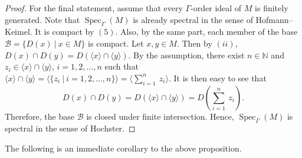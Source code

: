 \documentclass[a4paper,reqno,12pt]{amsart}
\numberwithin{equation}{section}
\newtheorem{thm}{Theorem}[section]
\theoremstyle{definition}
\theoremstyle{remark}
\newcommand{\Spec}{\operatorname{Spec}}
\begin{document}
\begin{proof}
For the final statement, assume that every $\Gamma$-order ideal of $M$ is finitely generated. Note that $\Spec_\Gamma(M)$ is already spectral in the sense of Hofmann--Keimel. It is compact by $(5)$. Also, by the same part, each member of the base $\mathcal{B}=\{D(x)~|~x\in M\}$ is compact. Let $x,y\in M$. Then by $(ii)$, $D(x)\cap D(y)=D\left(\langle x\rangle \cap \langle y\rangle\right)$. By the assumption, there exist $n\in \mathbb{N}$ and $z_i\in \langle x\rangle \cap \langle y\rangle$, $i=1,2,\ldots,n$ such that $\langle x\rangle \cap \langle y\rangle=\langle \{z_i~|~i=1,2,\ldots,n\}\rangle=\langle \displaystyle{\sum_{i=1}^{n}}~z_i\rangle$. It is then easy to see that \[D(x)\cap D(y)=D\left(\langle x\rangle \cap \langle y\rangle\right)=D\left(\displaystyle{\sum_{i=1}^{n}}~z_i\right).\] Therefore, the base $\mathcal{B}$ is closed under finite intersection. Hence, $\Spec_\Gamma(M)$ is spectral in the sense of Hochster. 
\end{proof}

The following is an immediate corollary to the above proposition.
\end{document}
